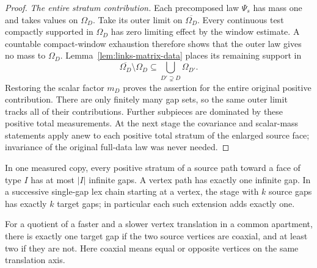 \begin{proof}
\emph{The entire stratum contribution.}
Each precomposed law \(\Psi_s\) has mass one and takes values on
\(\Omega_D\). Take its outer limit on
\(\overline{\Omega_D}\). Every continuous test compactly
supported in \(\Omega_D\) has zero limiting effect by the
window estimate. A countable compact-window exhaustion therefore
shows that the outer law gives no mass to \(\Omega_D\).
Lemma~\ref{lem:links-matrix-data} places its remaining support in
\[
 \overline{\Omega_D}\setminus\Omega_D
       \subseteq\bigcup_{D'\supsetneq D}\Omega_{D'}.
\]
Restoring the scalar factor \(m_D\) proves the assertion for
the entire original positive contribution. There are only
finitely many gap sets, so the same outer limit tracks all of
their contributions. Further subpieces are dominated by these
positive total measurements. At the next stage the covariance
and scalar-mass statements apply anew to each positive total
stratum of the enlarged source face; invariance of the original
full-data law was never needed.
\end{proof}

\begin{proposition}
\label{prop:links-gap-count}
In one measured copy, every positive stratum of a source path
toward a face of type \(I\) has at most \(|I|\) infinite gaps.
A vertex path has exactly one infinite gap. In a successive
single-gap lex chain starting at a vertex, the stage with
\(k\) source gaps has exactly \(k\) target gaps; in particular
each such extension adds exactly one.

For a quotient of a faster and a slower vertex translation in a
common apartment, there is exactly one target gap if the two
source vertices are coaxial, and at least two if they are not.
Here coaxial means equal or opposite vertices on the same
translation axis.
\end{proposition}

